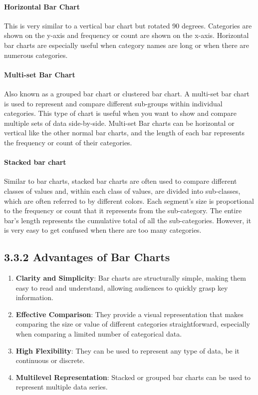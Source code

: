 \documentclass{article}\usepackage[]{graphicx}\usepackage[]{xcolor}
\begin{document}
\paragraph{Horizontal Bar Chart}
This is very similar to a vertical bar chart but rotated 90 degrees. Categories are shown on the y-axis and frequency or count are shown on the x-axis. Horizontal bar charts are especially useful when category names are long or when there are numerous categories.
\paragraph{Multi-set Bar Chart}
Also known as a grouped bar chart or clustered bar chart. A multi-set bar chart is used to represent and compare different sub-groups within individual categories. This type of chart is useful when you want to show and compare multiple sets of data side-by-side.
Multi-set Bar charts can be horizontal or vertical like the other normal bar charts, and the length of each bar represents the frequency or count of their categories.
\paragraph{Stacked bar chart}
Similar to bar charts, stacked bar charts are often used to compare different classes of values and, within each class of values, are divided into sub-classes, which are often referred to by different colors. Each segment's size is proportional to the frequency or count that it represents from the sub-category. The entire bar's length represents the cumulative total of all the sub-categories.
However, it is very easy to get confused when there are too many categories.

\subsection*{3.3.2 Advantages of Bar Charts}
\begin{enumerate}
\item \textbf{Clarity and Simplicity}: Bar charts are structurally simple, making them easy to read and understand, allowing audiences to quickly grasp key information.
    \item \textbf{Effective Comparison}: They provide a visual representation that makes comparing the size or value of different categories straightforward, especially when comparing a limited number of categorical data.
    \item \textbf{High Flexibility}: They can be used to represent any type of data, be it continuous or discrete.
    \item \textbf{Multilevel Representation}: Stacked or grouped bar charts can be used to represent multiple data series.
\end{enumerate}
\end{document}
